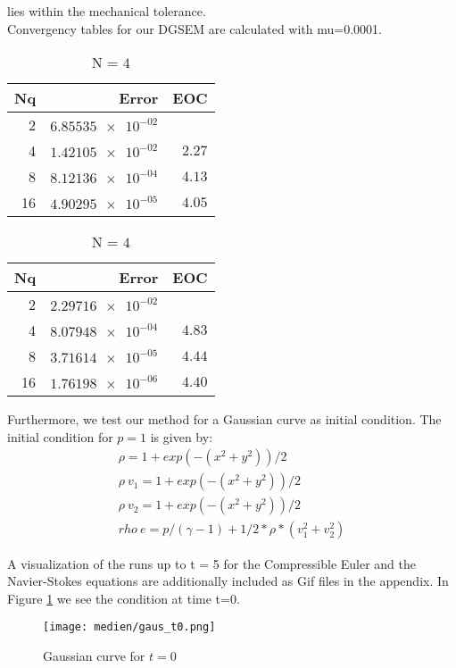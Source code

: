 \documentclass[11pt]{scrartcl}
\begin{document}
lies within the mechanical tolerance.\\

Convergency tables for our DGSEM are calculated with mu=0.0001.

\begin{table}[H]
\parbox{.45\linewidth}{
\centering
    \begin{tabular}{|r|r|r|}
    \hline\hline
    \textbf{Nq} & \textbf{Error} & \textbf{EOC} \\\hline
    2 & $\num{6.85535e-02}$ &  \\
    4 & $\num{1.42105e-02}$ & $\num{2.27}$ \\
    8 & $\num{8.12136e-04}$ & $\num{4.13}$ \\
    16 & $\num{4.90295e-05}$ & $\num{4.05}$ \\\hline\hline
  \end{tabular} 
  \caption{N = $3$}
  }
  \hspace{0.5cm}
  \parbox{.45\linewidth}{
	\centering
    \begin{tabular}{|r|r|r|}
    \hline\hline
    \textbf{Nq} & \textbf{Error} & \textbf{EOC} \\\hline
    2 & $\num{2.29716e-02}$ &  \\
    4 & $\num{8.07948e-04}$ & $\num{4.83}$ \\
    8 & $\num{3.71614e-05}$ & $\num{4.44}$ \\
    16 & $\num{1.76198e-06}$ & $\num{4.40}$ \\\hline\hline
  \end{tabular}
   \caption{N = $4$}
  }
\end{table}

Furthermore, we test our method for a Gaussian curve as initial condition.
The initial condition for $p=1$ is given by:
\begin{align*}
	\rho = 1 + exp(-(x^2 + y^2)) / 2 \\
	\rho \ v_1 = 1 + exp(-(x^2 + y^2)) / 2 \\
	\rho \ v_2 = 1 + exp(-(x^2 + y^2)) / 2 \\
	rho \ e = p / (\gamma - 1) + 1 / 2 * \rho * (v_1^2 + v_2^2)
\end{align*}

A visualization of the runs up to t = 5 for the Compressible Euler and the Navier-Stokes equations are additionally included as Gif files in the appendix. 
In Figure \ref{gaust0} we see the condition at time t=0.
\begin{figure}[H]
	\centering
	\texttt{[image: medien/gaus\_t0.png]}
	\label{gaust0}
	\caption{Gaussian curve for $t=0$}
\end{figure}
\end{document}
